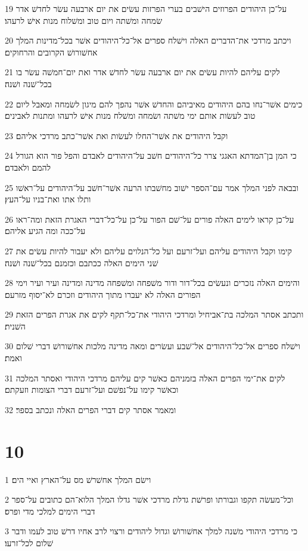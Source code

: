 \par 19 על־כן היהודים הפרוזים הישׁבים בערי הפרזות עשׂים את יום ארבעה עשׂר לחדשׁ אדר שׂמחה ומשׁתה ויום טוב ומשׁלוח מנות אישׁ לרעהו׃
\par 20 ויכתב מרדכי את־הדברים האלה וישׁלח ספרים אל־כל־היהודים אשׁר בכל־מדינות המלך אחשׁורושׁ הקרובים והרחוקים׃
\par 21 לקים עליהם להיות עשׂים את יום ארבעה עשׂר לחדשׁ אדר ואת יום־חמשׁה עשׂר בו בכל־שׁנה ושׁנה׃
\par 22 כימים אשׁר־נחו בהם היהודים מאיביהם והחדשׁ אשׁר נהפך להם מיגון לשׂמחה ומאבל ליום טוב לעשׂות אותם ימי משׁתה ושׂמחה ומשׁלח מנות אישׁ לרעהו ומתנות לאבינים׃
\par 23 וקבל היהודים את אשׁר־החלו לעשׂות ואת אשׁר־כתב מרדכי אליהם׃
\par 24 כי המן בן־המדתא האגגי צרר כל־היהודים חשׁב על־היהודים לאבדם והפל פור הוא הגורל להמם ולאבדם׃
\par 25 ובבאה לפני המלך אמר עם־הספר ישׁוב מחשׁבתו הרעה אשׁר־חשׁב על־היהודים על־ראשׁו ותלו אתו ואת־בניו על־העץ׃
\par 26 על־כן קראו לימים האלה פורים על־שׁם הפור על־כן על־כל־דברי האגרת הזאת ומה־ראו על־ככה ומה הגיע אליהם׃
\par 27 קימו וקבל היהודים עליהם ועל־זרעם ועל כל־הנלוים עליהם ולא יעבור להיות עשׂים את שׁני הימים האלה ככתבם וכזמנם בכל־שׁנה ושׁנה׃
\par 28 והימים האלה נזכרים ונעשׂים בכל־דור ודור משׁפחה ומשׁפחה מדינה ומדינה ועיר ועיר וימי הפורים האלה לא יעברו מתוך היהודים וזכרם לא־יסוף מזרעם׃
\par 29 ותכתב אסתר המלכה בת־אביחיל ומרדכי היהודי את־כל־תקף לקים את אגרת הפרים הזאת השׁנית׃
\par 30 וישׁלח ספרים אל־כל־היהודים אל־שׁבע ועשׂרים ומאה מדינה מלכות אחשׁורושׁ דברי שׁלום ואמת׃
\par 31 לקים את־ימי הפרים האלה בזמניהם כאשׁר קים עליהם מרדכי היהודי ואסתר המלכה וכאשׁר קימו על־נפשׁם ועל־זרעם דברי הצומות וזעקתם׃
\par 32 ומאמר אסתר קים דברי הפרים האלה ונכתב בספר׃

\chapter{10}

\par 1 וישׂם המלך אחשׁרשׁ מס על־הארץ ואיי הים׃
\par 2 וכל־מעשׂה תקפו וגבורתו ופרשׁת גדלת מרדכי אשׁר גדלו המלך הלוא־הם כתובים על־ספר דברי הימים למלכי מדי ופרס׃
\par 3 כי מרדכי היהודי משׁנה למלך אחשׁורושׁ וגדול ליהודים ורצוי לרב אחיו דרשׁ טוב לעמו ודבר שׁלום לכל־זרעו׃


